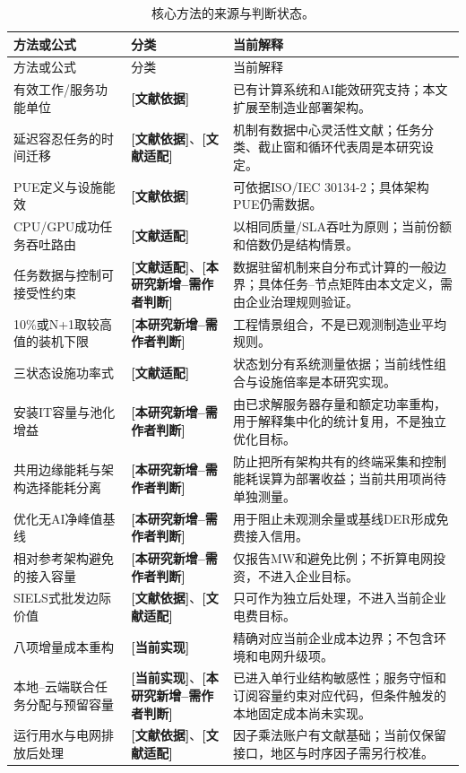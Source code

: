 \documentclass[preprint]{elsarticle}
\newcommand{\implemented}{\textcolor{green!40!black}{\textbf{[当前实现]}}}
\newcommand{\literature}{\textcolor{blue!70!black}{\textbf{[文献依据]}}}
\newcommand{\adapted}{\textcolor{violet!75!black}{\textbf{[文献适配]}}}
\newcommand{\newwork}{\textcolor{orange!80!black}{\textbf{[本研究新增--需作者判断]}}}
\begin{document}
\begin{longtable}{p{4.0cm}p{3.0cm}p{7.5cm}}
 \caption{核心方法的来源与判断状态。}\label{tab:formula-origin}\\
 \toprule
 方法或公式 & 分类 & 当前解释 \\
 \midrule
 \endfirsthead
 \toprule
 方法或公式 & 分类 & 当前解释 \\
 \midrule
 \endhead
 有效工作/服务功能单位 & \literature & 已有计算系统和AI能效研究支持；本文扩展至制造业部署架构。 \\
 延迟容忍任务的时间迁移 & \literature、\adapted & 机制有数据中心灵活性文献；任务分类、截止窗和循环代表周是本研究设定。 \\
 PUE定义与设施能效 & \literature & 可依据ISO/IEC 30134-2；具体架构PUE仍需数据。 \\
 CPU/GPU成功任务吞吐路由 & \adapted & 以相同质量/SLA吞吐为原则；当前份额和倍数仍是结构情景。 \\
 任务数据与控制可接受性约束 & \adapted、\newwork & 数据驻留机制来自分布式计算的一般边界；具体任务--节点矩阵由本文定义，需由企业治理规则验证。 \\
 10\%或N+1取较高值的装机下限 & \newwork & 工程情景组合，不是已观测制造业平均规则。 \\
 三状态设施功率式 & \adapted & 状态划分有系统测量依据；当前线性组合与设施倍率是本研究实现。 \\
 安装IT容量与池化增益 & \newwork & 由已求解服务器存量和额定功率重构，用于解释集中化的统计复用，不是独立优化目标。 \\
 共用边缘能耗与架构选择能耗分离 & \newwork & 防止把所有架构共有的终端采集和控制能耗误算为部署收益；当前共用项尚待单独测量。 \\
 优化无AI净峰值基线 & \newwork & 用于阻止未观测余量或基线DER形成免费接入信用。 \\
 相对参考架构避免的接入容量 & \newwork & 仅报告MW和避免比例；不折算电网投资，不进入企业目标。 \\
 SIELS式批发边际价值 & \literature、\adapted & 只可作为独立后处理，不进入当前企业电费目标。 \\
 八项增量成本重构 & \implemented & 精确对应当前企业成本边界；不包含环境和电网升级项。 \\
 本地--云端联合任务分配与预留容量 & \implemented、\newwork & 已进入单行业结构敏感性；服务守恒和订阅容量约束对应代码，但条件触发的本地固定成本尚未实现。 \\
 运行用水与电网排放后处理 & \literature、\adapted & 因子乘法账户有文献基础；当前仅保留接口，地区与时序因子需另行校准。 \\
 \bottomrule
\end{longtable}
\end{document}
